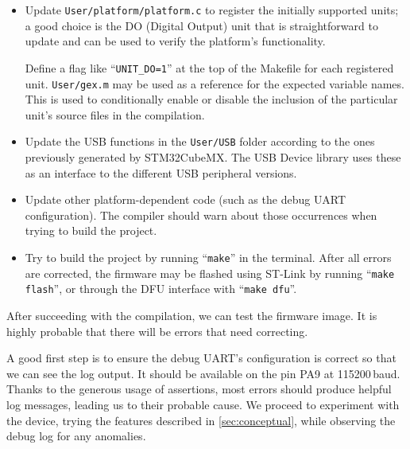 \begin{itemize}
	\item Update \verb|User/platform/platform.c| to register the initially supported units; a good choice is the DO (Digital Output) unit that is straightforward to update and can be used to verify the platform's functionality.
	
	Define a flag like ``\verb|UNIT_DO=1|'' at the top of the Makefile for each registered unit. \verb|User/gex.m| may be used as a reference for the expected variable names. This is used to conditionally enable or disable the inclusion of the particular unit's source files in the compilation.
	
	\item Update the USB functions in the \verb|User/USB| folder according to the ones previously generated by STM32CubeMX. The USB Device library uses these as an interface to the different \gls{USB} peripheral versions.
	
	\item Update other platform-dependent code (such as the debug \gls{UART} configuration). The compiler should warn about those occurrences when trying to build the project.	
	
	\item Try to build the project by running ``\verb|make|'' in the terminal. After all errors are corrected, the firmware may be flashed using ST-Link by running ``\verb|make flash|'', or through the \gls{DFU} interface with ``\verb|make dfu|''.
\end{itemize}

After succeeding with the compilation, we can test the firmware image. It is highly probable that there will be errors that need correcting. 

A good first step is to ensure the debug \gls{UART}'s configuration is correct so that we can see the log output. It should be available on the pin PA9 at 115200\,baud. Thanks to the generous usage of assertions, most errors should produce helpful log messages, leading us to their probable cause. We proceed to experiment with the device, trying the features described in \cref{sec:conceptual}, while observing the debug log for any anomalies.

